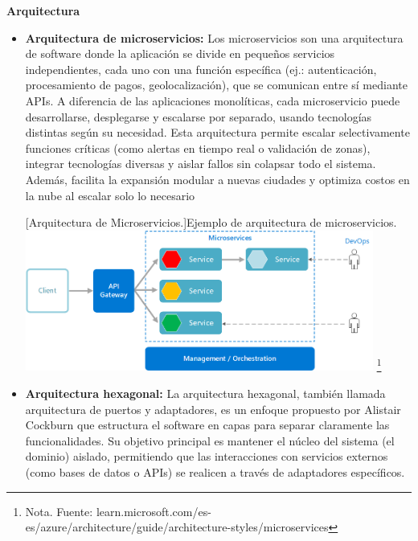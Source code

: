 \begin{itemize}
\begin{itemize}
\end{itemize}

\vspace{5mm}
\textbf{Arquitectura} 

\begin{itemize}
    \item\textbf{Arquitectura de microservicios: }Los microservicios son una arquitectura de software donde la aplicación se divide en pequeños servicios independientes, cada uno con una función específica (ej.: autenticación, procesamiento de pagos, geolocalización), que se comunican entre sí mediante APIs. A diferencia de las aplicaciones monolíticas, cada microservicio puede desarrollarse, desplegarse y escalarse por separado, usando tecnologías distintas según su necesidad.
        Esta arquitectura permite escalar selectivamente funciones críticas (como alertas en tiempo real o validación de zonas), integrar tecnologías diversas y aislar fallos sin colapsar todo el sistema. Además, facilita la expansión modular a nuevas ciudades y optimiza costos en la nube al escalar solo lo necesario
        \vspace{2mm}
        \begin{center}
        \begin{minipage}{0.9\textwidth}
            \centering
            [{Arquitectura de Microservicios.}]{Ejemplo de arquitectura de microservicios.}
            \label{microservicios}
            \includegraphics[width=0.9\textwidth]{Content/Images/microservices-logical.png}
            \footnote{Nota. \textup{Fuente: learn.microsoft.com/es-es/azure/architecture/guide/architecture-styles/microservices}}
        \end{minipage}
        \end{center}
        \item \textbf{Arquitectura hexagonal: } La arquitectura hexagonal, también llamada arquitectura de puertos y adaptadores, es un enfoque propuesto por Alistair Cockburn que estructura el software en capas para separar claramente las funcionalidades. Su objetivo principal es mantener el núcleo del sistema (el dominio) aislado, permitiendo que las interacciones con servicios externos (como bases de datos o APIs) se realicen a través de adaptadores específicos.


\end{itemize}
\end{itemize}
